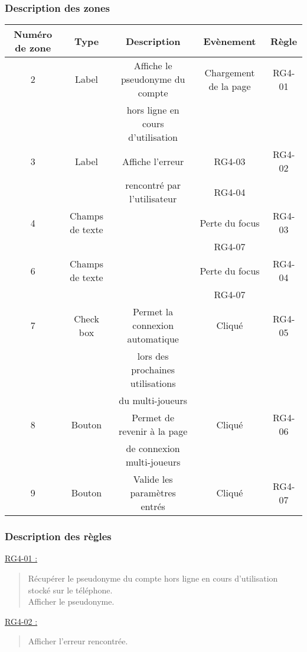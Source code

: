 \documentclass{report}
\begin{document}
		\subsubsection{Description des zones}
		
			\begin{tabular}{|c|c|c|c|c|} \hline
				Numéro de zone & Type  & Description & Evènement &	Règle \\\hline
				2 & Label & Affiche le pseudonyme du compte & Chargement de la page & RG4-01 \\
				  &       & hors ligne en cours d'utilisation & & \\\hline
				3 & Label & Affiche l'erreur & RG4-03 & RG4-02 \\
				  &       & rencontré par l'utilisateur & RG4-04 & \\\hline
				4 & Champs de texte & & Perte du focus & RG4-03 \\
				 & & & RG4-07 & \\\hline 
				6 & Champs de texte & & Perte du focus & RG4-04 \\
				 & & & RG4-07 & \\\hline 
				7 & Check box & Permet la connexion automatique & Cliqué & RG4-05 \\
				  &           & lors des prochaines utilisations&        & \\				
				  &           & du multi-joueurs                &        & \\\hline
				8 & Bouton & Permet de revenir à la page & Cliqué & RG4-06 \\
				  &        & de connexion multi-joueurs \footnotemark[1] & & \\\hline
				9 & Bouton & Valide les paramètres entrés & Cliqué & RG4-07 \\\hline
			\end{tabular}
			
		\subsubsection{Description des règles}

			\underline{RG4-01 :}
				\begin{quote}
					Récupérer le pseudonyme du compte hors ligne en cours d'utilisation stocké sur le téléphone.\\
					Afficher le pseudonyme.\\
				\end{quote}

			\underline{RG4-02 :}
				\begin{quote}
					Afficher l'erreur rencontrée.\\
				\end{quote}
				
\end{document}
